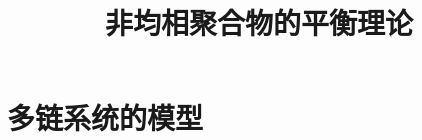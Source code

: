 \documentclass[12pt,a4paper]{article}
\title{非均相聚合物的平衡理论}
\author{}
\date{\chntoday}
\numberwithin{equation}{section}
\begin{document}
\maketitle
\section{}
\section{}
\section{}
\section{多链系统的模型}







\cite{tam19912d}

\end{document}
